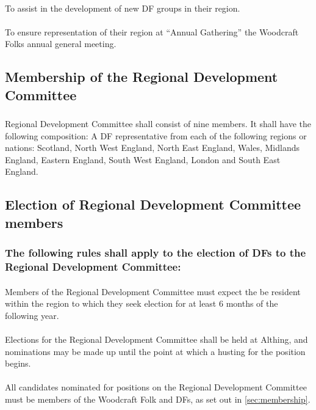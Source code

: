 \documentclass[a4paper, 12pt]{article}
\begin{document}
\paragraph{}
To assist in the development of new DF groups in their region.
\paragraph{}
To ensure representation of their region at ``Annual Gathering'' the Woodcraft Folks annual general meeting.

\subsection{Membership of the Regional Development Committee}
\label{sec:rdcmembership}
\subsubsection{}
Regional Development Committee shall consist of nine members. It shall have the following composition: A DF representative from each of the following regions or nations: Scotland, North West England, North East England, Wales, Midlands England, Eastern England, South West England, London and South East England.
\subsection{Election of Regional Development Committee members}
\subsubsection{The following rules shall apply to the election of DFs to the Regional Development Committee:}
\paragraph{}
\label{sec:regionalresidency}
Members of the Regional Development Committee must expect the be resident within the region to which they seek election for at least 6 months of the following year.
\paragraph{}
Elections for the Regional Development Committee shall be held at Althing, and nominations may be made up until the point at which a husting for the position begins.
\paragraph{}
All candidates nominated for positions on the Regional Development Committee must be members of the Woodcraft Folk and DFs, as set out in \ref{sec:membership}.
\end{document}
